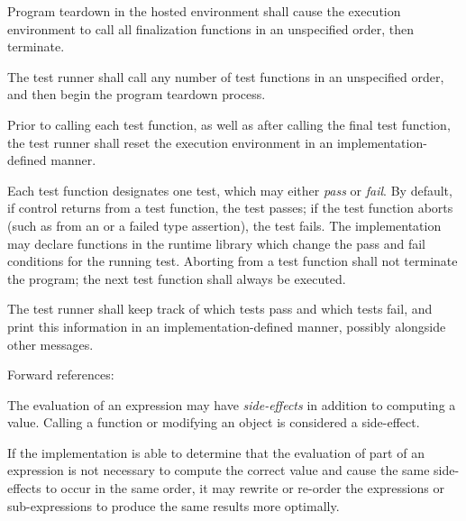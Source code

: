 \specsubsubitem
Program teardown in the hosted environment shall cause the execution environment
to call all finalization functions in an unspecified order, then terminate.

\specsubsubitem
The test runner shall call any number of test functions in an unspecified order,
and then begin the program teardown process.


\specsubsubitem
Prior to calling each test function, as well as after calling the final test
function, the test runner shall reset the execution environment in an
implementation-defined manner.


\specsubsubitem
Each test function designates one test, which may either \textit{pass} or
\textit{fail}. By default, if control returns from a test function, the test
passes; if the test function aborts (such as from an
 or a failed type assertion), the test fails.
The implementation may declare functions in the runtime library which change the
pass and fail conditions for the running test. Aborting from a test function
shall not terminate the program; the next test function shall always be
executed.

\specsubsubitem
The test runner shall keep track of which tests pass and which tests fail, and
print this information in an implementation-defined manner, possibly alongside
other messages.

Forward references: 


\specsubsubitem
The evaluation of an expression may have \textit{side-effects} in addition to
computing a value. Calling a function or modifying an object is considered a
side-effect.

\specsubsubitem
If the implementation is able to determine that the evaluation of part of an
expression is not necessary to compute the correct value and cause the same
side-effects to occur in the same order, it may rewrite or re-order the
expressions or sub-expressions to produce the same results more optimally.

